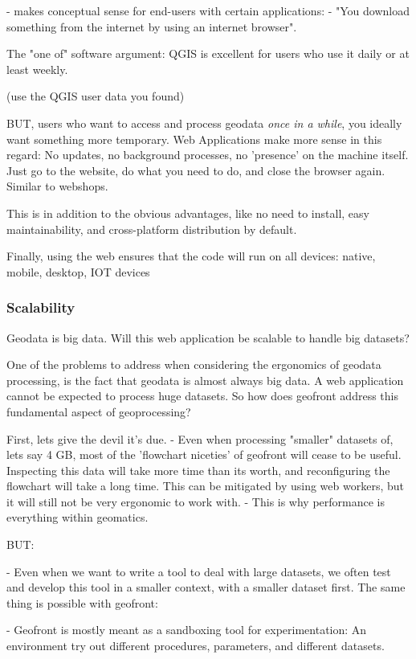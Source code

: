- makes conceptual sense for end-users with certain applications: 
  - "You download something from the internet by using an internet browser".

The "one of" software argument: QGIS is excellent for users who use it daily or at least weekly. 

(use the QGIS user data you found)

BUT, users who want to access and process geodata \emph{once in a while}, you ideally want something more temporary. Web Applications make more sense in this regard: No updates, no background processes, no 'presence' on the machine itself. Just go to the website, do what you need to do, and close the browser again. Similar to webshops.

This is in addition to the obvious advantages, like no need to install, easy maintainability, and cross-platform distribution by default.

Finally, using the web ensures that the code will run on all devices: native, mobile, desktop, IOT devices

\subsubsection{Scalability}

Geodata is big data. Will this web application be scalable to handle big datasets?

One of the problems to address when considering the ergonomics of geodata processing, is the fact that geodata is almost always big data. A web application cannot be expected to process huge datasets. So how does geofront address this fundamental aspect of geoprocessing? 

First, lets give the devil it's due. 
- Even when processing "smaller" datasets of, lets say 4 GB, most of the 'flowchart niceties' of geofront will cease to be useful. Inspecting this data will take more time than its worth, and reconfiguring the flowchart will take a long time. This can be mitigated by using web workers, but it will still not be very ergonomic to work with. 
- This is why performance is everything within geomatics.

BUT: 

- Even when we want to write a tool to deal with large datasets, we often test and develop this tool in a smaller context, with a smaller dataset first. The same thing is possible with geofront: 

- Geofront is mostly meant as a sandboxing tool for experimentation: An environment try out different procedures, parameters, and different datasets. 

